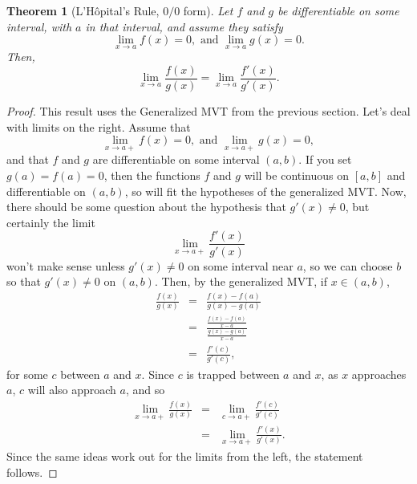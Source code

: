 \documentclass[a4paper]{amsproc}
\theoremstyle{plain}
\newtheorem{thm}{Theorem}[section]
\numberwithin{equation}{section} %
\numberwithin{figure}{section} %
\theoremstyle{plain}
\theoremstyle{definition}
\theoremstyle{definition}
\theoremstyle{remark}
\begin{document}
\begin{thm}[L'H\^{o}pital's Rule, \(0/0\) form]
Let \( f \) and \( g \) be differentiable on some interval, with \( a \) in that interval, and assume they satisfy
\[\lim _{x\rightarrow a}f(x)=0,\, \, \mathrm{and}\, \, \lim _{x\rightarrow a}g(x)=0.\]
 Then,
\[\lim _{x\rightarrow a}\frac{f(x)}{g(x)}=\lim _{x\rightarrow a}\frac{f'(x)}{g'(x)}.\]
\end{thm}
\begin{proof}
This result uses the Generalized MVT from the previous section. Let's deal with limits on the right. Assume that
\[
\lim _{x\rightarrow a+}f(x)=0,\, \, \mathrm{and}\, \, \lim _{x\rightarrow a+}g(x)=0,
\]
and that \( f \) and \( g \) are differentiable on some interval \( (a,b). \) If you set \( g(a)=f(a)=0 \), then the functions \( f \)
and \( g \) will be continuous on \( [a,b] \) and differentiable on \( (a,b) \), so will fit the hypotheses of the generalized MVT.
Now, there should be some question about the hypothesis that \( g'(x)\neq 0 \), but certainly the limit
\[
\lim _{x\rightarrow a+}\frac{f'(x)}{g'(x)}
\]
won't make sense unless \( g'(x)\neq 0 \) on some interval near \( a \), so we can choose \( b \) so that \( g'(x)\neq 0 \) on
\( (a,b) \). Then, by the generalized MVT, if \( x\in (a,b) \),
\begin{eqnarray*}
\frac{f(x)}{g(x)} & = &\frac{f(x)-f(a)}{g(x)-g(a)}\\
                  & = &\frac{\tfrac{f(x)-f(a)}{x-a}}{\tfrac{g(x)-g(a)}{x-a}}\\
                  & = &\frac{f'(c)}{g'(c)},
\end{eqnarray*}
for some \( c \) between \( a \) and \( x \). Since \( c \) is trapped between \( a \) and \( x \), as \( x \) approaches \( a \),
\( c \) will also approach \( a \), and so
\begin{eqnarray*}
\lim _{x\rightarrow a+}\frac{f(x)}{g(x)} & = & \lim _{c\rightarrow a+}\frac{f'(c)}{g'(c)}\\
 & = & \lim _{x\rightarrow a+}\frac{f'(x)}{g'(x)}.
\end{eqnarray*}
Since the same ideas work out for the limits from the left, the statement follows.
\end{proof}
\end{document}
